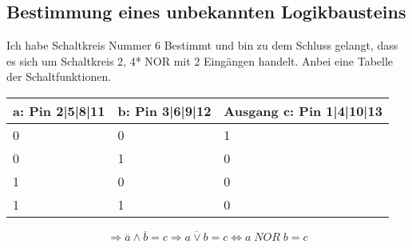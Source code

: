 \subsection{Bestimmung eines unbekannten Logikbausteins}
Ich habe Schaltkreis Nummer 6 Bestimmt und bin zu dem Schluss gelangt, dass es sich um Schaltkreis 2, 4* NOR mit 2 Eingängen handelt. Anbei eine Tabelle der Schaltfunktionen.
\begin{tabular}{|l|l|l|}
	\hline
	a: Pin 2|5|8|11 & b: Pin 3|6|9|12 & Ausgang c: Pin 1|4|10|13 \\
	\hline
	0 & 0 & 1\\
	0 & 1 & 0\\
	1 & 0 & 0\\
	1 & 1 & 0\\
	\hline
\end{tabular}
\[ \Rightarrow \overline{a} \wedge \overline{b} = c \Rightarrow \overline{a \vee b} = c \Leftrightarrow a\;NOR\;b=c \]

















